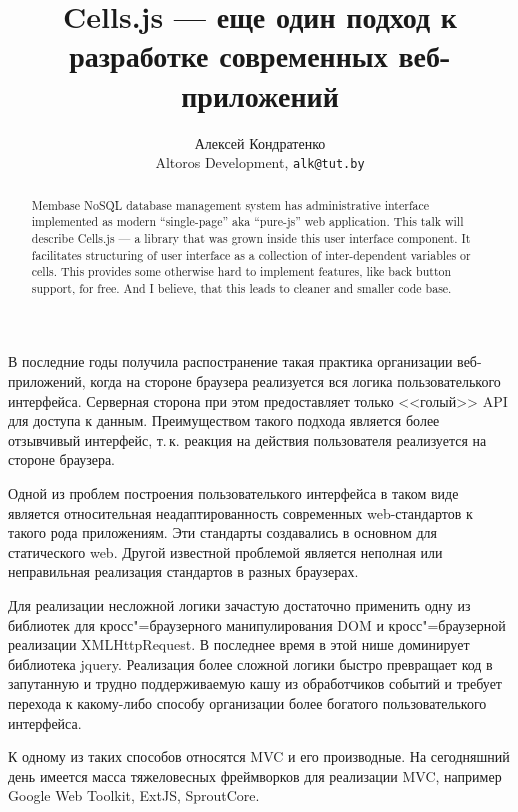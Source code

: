 \documentclass[10pt, a5paper]{article}
\begin{document}
\title{Cells.js --- еще один подход к разработке современных веб-приложений}

\author{Алексей Кондратенко\\
\small Altoros Development, \texttt{alk@tut.by}
}
\maketitle

\begin{abstract}
Membase NoSQL database management system has admi\-ni\-stra\-tive interface 
implemented as modern ``single-page'' aka ``pure-js'' web application. 
This talk will describe Cells.js --- a library that was grown inside 
this user interface component. It facilitates structuring of user 
interface as a collection of inter-dependent variables or cells. This 
provides some otherwise hard to implement features, like back button 
support, for free. And I believe, that this leads to cleaner and smaller 
code base.
\end{abstract}

В последние годы получила распостранение такая практика организации
веб-приложений, когда на стороне браузера реализуется вся логика
пользователького интерфейса. Серверная сторона при этом предоставляет
только <<голый>> API для доступа к данным. Преимуществом такого подхода
является более отзывчивый интерфейс, т.\,к. реакция на действия
пользователя реализуется на стороне браузера.

Одной из проблем построения пользователького интерфейса в таком виде
является относительная неадаптированность современных web-стандартов
к такого рода приложениям. Эти стандарты создавались в основном для
статического web. Другой известной проблемой является неполная или
неправильная реализация стандартов в разных браузерах.

Для реализации несложной логики зачастую достаточно применить одну из
библиотек для кросс"=браузерного манипулирования DOM и кросс"=браузерной
реализации XMLHttpRequest. В последнее время в этой нише доминирует
библиотека jquery. Реализация более сложной логики быстро превращает
код в запутанную и трудно поддерживаемую кашу из обработчиков событий и 
требует перехода к какому-либо способу организации более богатого
пользователького интерфейса.

К одному из таких способов относятся MVC и его производные. На
сегодняшний день имеется масса тяжеловесных фреймворков для
реализации MVC, например Google Web Toolkit, ExtJS, SproutCore.
\end{document}
